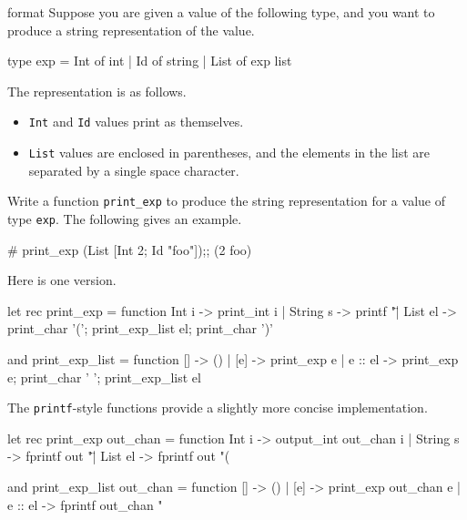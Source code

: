%
\begin{exercise}{format}
Suppose you are given a value of the following type, and you want to
produce a string representation of the value.

\begin{ocaml}
type exp =
   Int of int
 | Id of string
 | List of exp list
\end{ocaml}
%
The representation is as follows.
\begin{itemize}
\item \lstinline+Int+ and \hbox{\lstinline+Id+} values print as themselves.
\item

\lstinline+List+
values are enclosed in parentheses, and the elements in the list are
separated by a single space character.
\end{itemize}
%
Write a function \lstinline$print_exp$ to produce the string representation for a value of
type \hbox{\lstinline+exp+}.  The following gives an example.

\begin{ocaml}
# print_exp (List [Int 2; Id "foo"]);;
(2 foo)
\end{ocaml}

\begin{answer}\ifanswers
Here is one version.
\begin{ocaml}
let rec print_exp = function
   Int i -> print_int i
 | String s -> printf "\"%
 | List el -> print_char '('; print_exp_list el; print_char ')'

and print_exp_list = function
   [] -> ()
 | [e] -> print_exp e
 | e :: el ->
     print_exp e;
     print_char ' ';
     print_exp_list el
\end{ocaml}
%
The \hbox{\lstinline/printf/}-style functions provide a slightly more concise implementation.

\begin{ocaml}
let rec print_exp out_chan = function
   Int i -> output_int out_chan i
 | String s -> fprintf out "\"%
 | List el -> fprintf out "(%

and print_exp_list out_chan = function
   [] -> ()
 | [e] -> print_exp out_chan e
 | e :: el -> fprintf out_chan "%
\end{ocaml}
\fi\end{answer}
\end{exercise}

